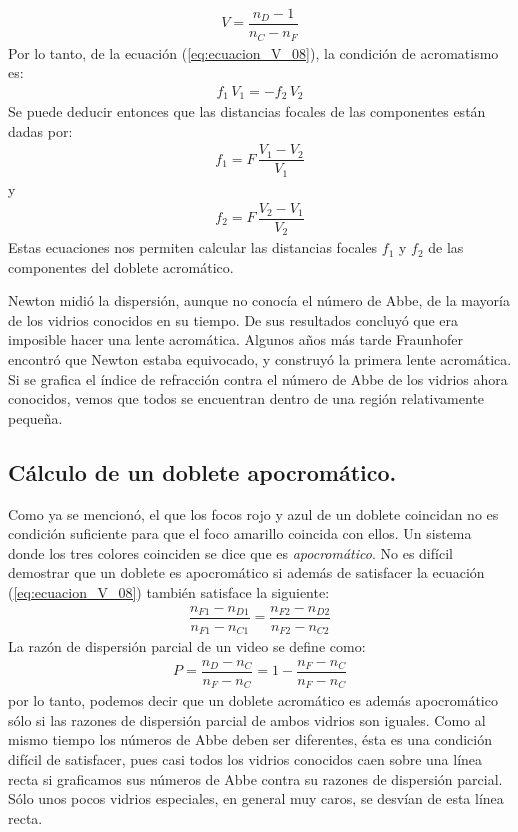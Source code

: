 \documentclass[14pt]{extarticle}
\begin{document}
\begin{align}
V = \dfrac{n_{D} - 1}{n_{C} - n_{F}}
\label{eq:ecuacion_V_09}
\end{align}
Por lo tanto, de la ecuación (\ref{eq:ecuacion_V_08}), la condición de acromatismo es:
\begin{align}
f_{1} \, V_{1} = - f_{2} \, V_{2}
\label{eq:ecuacion_V10}
\end{align}
Se puede deducir entonces que las distancias focales de las componentes están dadas por:
\begin{align}
f_{1} = F \, \dfrac{V_{1} - V_{2}}{V_{1}}
\label{eq:ecuacion_V_11}
\end{align}
y
\begin{align}
f_{2} = F \, \dfrac{V_{2} - V_{1}}{V_{2}}
\label{eq:ecuacion_V_12}
\end{align}
Estas ecuaciones nos permiten calcular las distancias focales $f_{1}$ y $f_{2}$ de las componentes del doblete acromático.

Newton midió la dispersión, aunque no conocía el número de Abbe, de la mayoría de los vidrios conocidos en su tiempo. De sus resultados concluyó que era imposible hacer una lente acromática. Algunos años más tarde Fraunhofer encontró que Newton estaba equivocado, y construyó la primera lente acromática.
Si se grafica el índice de refracción contra el número de Abbe de los vidrios ahora conocidos, vemos que todos se encuentran dentro de una región relativamente pequeña.

\subsection{Cálculo de un doblete apocromático.}

Como ya se mencionó, el que los focos rojo y azul de un doblete coincidan no es condición suficiente para que el foco amarillo coincida con ellos. Un sistema donde los tres colores coinciden se dice que es \textit{apocromático}. No es difícil demostrar que un doblete es apocromático si además de satisfacer la ecuación (\ref{eq:ecuacion_V_08}) también satisface la siguiente:
\begin{align}
\dfrac{n_{F1} - n_{D1}}{n_{F1} - n_{C1}} = \dfrac{n_{F2} - n_{D2}}{n_{F2} - n_{C2}}
\label{eq:ecuacion_V_13}
\end{align}
La razón de dispersión parcial de un video se define como:
\begin{align}
P = \dfrac{n_{D} - n_{C}}{n_{F} - n_{C}} =  1 - \dfrac{n_{F} - n_{C}}{n_{F} - n_{C}}
\label{eq:ecuacion_V_14}
\end{align}
por lo tanto, podemos decir que un doblete acromático es además apocromático sólo si las razones de dispersión parcial de ambos vidrios son iguales. Como al mismo tiempo los números de Abbe deben ser diferentes, ésta es una condición difícil de satisfacer, pues casi todos los vidrios conocidos caen sobre una línea recta si graficamos sus números de Abbe contra su razones de dispersión parcial. Sólo unos pocos vidrios especiales, en general muy caros, se desvían de esta línea recta.
\end{document}
